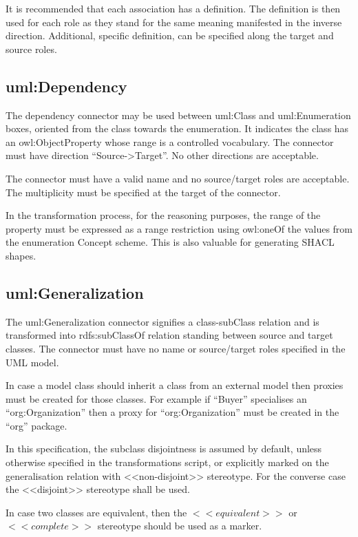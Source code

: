 	It is recommended that each association has a definition. The definition is then used for each role as they stand for the same meaning manifested in the inverse direction. Additional, specific definition, can be specified along the target and source roles. 
	
	
	\subsection{uml:Dependency}
	\label{sec:dependency}
	
	The dependency connector may be used between uml:Class and uml:Enumeration boxes, oriented from the class towards the enumeration. It indicates the class has an owl:ObjectProperty whose range is a controlled vocabulary. 
	The connector must have direction ``Source->Target''. No other directions are acceptable. 
	
	The connector must have a valid name and no source/target roles are acceptable. The multiplicity must be specified at the target of the connector. 
	
	In the transformation process, for the reasoning purposes, the range of the property must be expressed as a range restriction using owl:oneOf the values from the enumeration Concept scheme. This is also valuable for generating SHACL shapes.
		
	\subsection{uml:Generalization}
	\label{sec:degenalization}
	
	The uml:Generalization connector signifies a class-subClass relation and is transformed into rdfs:subClassOf relation standing between source and target classes. The connector must have no name or source/target roles specified in the UML model.
	
	In case a model class should inherit a class from an external model then proxies must be created for those classes. For example if ``Buyer'' specialises an ``org:Organization'' then a proxy for ``org:Organization'' must be created in the ``org'' package. 
	
	In this specification, the subclass disjointness is assumed by default, unless otherwise specified in the transformations script, or explicitly marked on the generalisation relation with <<non-disjoint>> stereotype. For the converse case the <<disjoint>> stereotype shall be used.
	 
	In case two classes are equivalent, then the $<<equivalent>>$ or $<<complete>>$ stereotype should be used as a marker. 
	
	